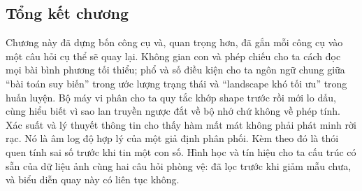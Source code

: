 \documentclass[../../deep_learning.tex]{subfiles}
\begin{document}
\subsection*{Tổng kết chương}
Chương này đã dựng bốn công cụ và, quan trọng hơn, đã gắn mỗi công cụ vào một câu hỏi cụ thể sẽ quay lại. Không gian con và phép chiếu cho ta cách đọc mọi bài bình phương tối thiểu; phổ và số điều kiện cho ta ngôn ngữ chung giữa ``bài toán suy biến'' trong ước lượng trạng thái và ``landscape khó tối ưu'' trong huấn luyện. Bộ máy vi phân cho ta quy tắc khớp shape trước rồi mới lo dấu, cùng hiểu biết vì sao lan truyền ngược đắt về bộ nhớ chứ không về phép tính. Xác suất và lý thuyết thông tin cho thấy hàm mất mát không phải phát minh rời rạc. Nó là âm log độ hợp lý của một giả định phân phối. Kèm theo đó là thói quen tính sai số trước khi tin một con số. Hình học và tín hiệu cho ta cấu trúc có sẵn của dữ liệu ảnh cùng hai câu hỏi phòng vệ: đã lọc trước khi giảm mẫu chưa, và biểu diễn quay này có liên tục không.
\end{document}
